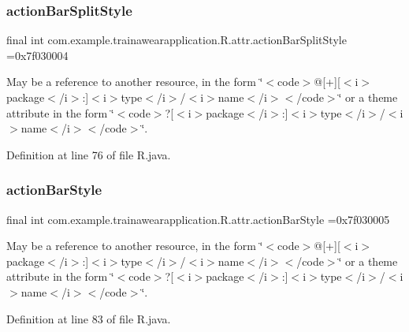 \subsubsection{\texorpdfstring{actionBarSplitStyle}{actionBarSplitStyle}}
{\footnotesize\ttfamily final int com.\+example.\+trainawearapplication.\+R.\+attr.\+action\+Bar\+Split\+Style =0x7f030004\hspace{0.3cm}{\ttfamily [static]}}

May be a reference to another resource, in the form \char`\"{}$<$code$>$@\mbox{[}+\mbox{]}\mbox{[}$<$i$>$package$<$/i$>$\+:\mbox{]}$<$i$>$type$<$/i$>$/$<$i$>$name$<$/i$>$$<$/code$>$\char`\"{} or a theme attribute in the form \char`\"{}$<$code$>$?\mbox{[}$<$i$>$package$<$/i$>$\+:\mbox{]}$<$i$>$type$<$/i$>$/$<$i$>$name$<$/i$>$$<$/code$>$\char`\"{}. 

Definition at line 76 of file R.\+java.

\mbox{\label{classcom_1_1example_1_1trainawearapplication_1_1_r_1_1attr_af10b4287db4998d78c98eeded61b71a4}} 
\subsubsection{\texorpdfstring{actionBarStyle}{actionBarStyle}}
{\footnotesize\ttfamily final int com.\+example.\+trainawearapplication.\+R.\+attr.\+action\+Bar\+Style =0x7f030005\hspace{0.3cm}{\ttfamily [static]}}

May be a reference to another resource, in the form \char`\"{}$<$code$>$@\mbox{[}+\mbox{]}\mbox{[}$<$i$>$package$<$/i$>$\+:\mbox{]}$<$i$>$type$<$/i$>$/$<$i$>$name$<$/i$>$$<$/code$>$\char`\"{} or a theme attribute in the form \char`\"{}$<$code$>$?\mbox{[}$<$i$>$package$<$/i$>$\+:\mbox{]}$<$i$>$type$<$/i$>$/$<$i$>$name$<$/i$>$$<$/code$>$\char`\"{}. 

Definition at line 83 of file R.\+java.

\mbox{\label{classcom_1_1example_1_1trainawearapplication_1_1_r_1_1attr_ac1280dac486d23b7ddebee5cfc6917be}} 
